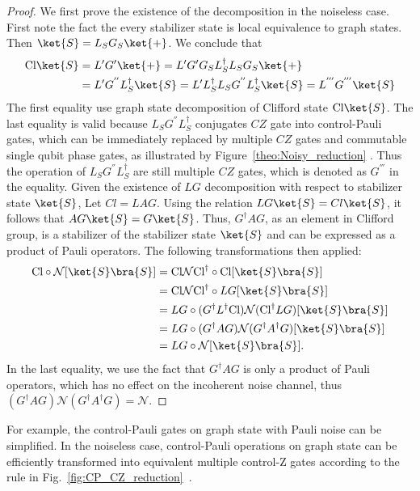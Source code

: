\documentclass[aps,%
twocolumn,%
floatfix,%
pra,%
amsfonts,%
longbibliography,%
groupedaddress,%
superscriptaddress]{revtex4-2}%
\newcommand{\1}{\mathbbm{1}}
\begin{document}
\begin{proof}
    We first prove the existence of the decomposition in the noiseless case. First note the fact the every stabilizer state is local equivalence to graph states. Then $\ket{S} = L_SG_S \ket{+}$. We conclude that
    \begin{align}
        \text{Cl} \ket{S} &= L' G' \ket{+} = L' G'G_S L_S^\dagger L_SG_S \ket{+} \\
        &=L' G^{''} L_S^\dagger \ket{S} = L'L_S^\dagger L_S G^{''} L_S^\dagger \ket{S}=L^{'''} G^{'''} \ket{S}
    \end{align}
    The first equality use graph state decomposition of Clifford state $\text{Cl}\ket{S}$. The last equality is valid because $L_S G^{''} L_S^\dagger$ conjugates $CZ$ gate into control-Pauli gates, which can be immediately replaced by multiple $CZ$ gates and commutable single qubit phase gates, as illustrated by Figure~\ref{theo:Noisy_reduction} . Thus the operation of $L_S G^{''} L_S^\dagger$ are still multiple $CZ$ gates, which is denoted as $G^{'''}$ in the equality.
    Given the existence of $LG$ decomposition with respect to stabilizer state $\ket{S}$, Let $Cl = LAG$. Using the relation $LG \ket{S} = Cl \ket{S}$, it follows that $A G \ket{S} = G \ket{S}$. Thus, $G^\dagger A G$, as an element in Clifford group, is a stabilizer of the stabilizer state $\ket{S}$ and can be expressed as a product of Pauli operators. The following transformations then applied:
\begin{align}
\text{Cl} \circ \mathcal{N}[\ket{S}\bra{S}] &= \text{Cl} \mathcal{N} \text{Cl}^\dagger \circ \text{Cl}[\ket{S}\bra{S}] \\
&= \text{Cl} \mathcal{N} \text{Cl}^\dagger \circ LG[\ket{S}\bra{S}] \\
&= LG \circ (G^\dagger L^\dagger \text{Cl}) \mathcal{N} (\text{Cl}^\dagger LG)[\ket{S}\bra{S}] \\
&= LG \circ (G^\dagger AG) \mathcal{N} (G^\dagger A^\dagger G)[\ket{S}\bra{S}]\\
&= LG \circ  \mathcal{N}[\ket{S}\bra{S}].
\end{align}
In the last equality, we use the fact that $G^\dagger A G$ is only a product of Pauli operators, which has no effect on the incoherent noise channel, thus $(G^\dagger AG) \mathcal{N} (G^\dagger A^\dagger G) = \mathcal{N}$.
\end{proof}
For example, the control-Pauli gates on graph state with Pauli noise can be simplified. In the noiseless case, control-Pauli operations on graph state can be efficiently transformed into equivalent multiple control-Z gates according to the rule in Fig.~\ref{fig:CP_CZ_reduction}~\cite{mor2023noisy}. 
\end{document}
